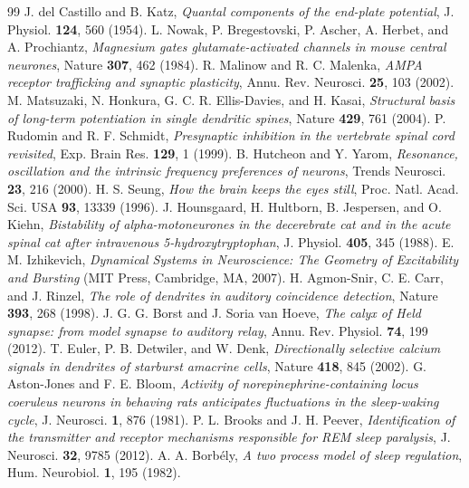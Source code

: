 \begin{thebibliography}{99}
 J. del Castillo and B. Katz, \emph{Quantal components of the end-plate potential}, J. Physiol. \textbf{124}, 560 (1954).
 L. Nowak, P. Bregestovski, P. Ascher, A. Herbet, and A. Prochiantz, \emph{Magnesium gates glutamate-activated channels in mouse central neurones}, Nature \textbf{307}, 462 (1984).
 R. Malinow and R. C. Malenka, \emph{AMPA receptor trafficking and synaptic plasticity}, Annu. Rev. Neurosci. \textbf{25}, 103 (2002).
 M. Matsuzaki, N. Honkura, G. C. R. Ellis-Davies, and H. Kasai, \emph{Structural basis of long-term potentiation in single dendritic spines}, Nature \textbf{429}, 761 (2004).
 P. Rudomin and R. F. Schmidt, \emph{Presynaptic inhibition in the vertebrate spinal cord revisited}, Exp. Brain Res. \textbf{129}, 1 (1999).
 B. Hutcheon and Y. Yarom, \emph{Resonance, oscillation and the intrinsic frequency preferences of neurons}, Trends Neurosci. \textbf{23}, 216 (2000).
 H. S. Seung, \emph{How the brain keeps the eyes still}, Proc. Natl. Acad. Sci. USA \textbf{93}, 13339 (1996).
 J. Hounsgaard, H. Hultborn, B. Jespersen, and O. Kiehn, \emph{Bistability of alpha-motoneurones in the decerebrate cat and in the acute spinal cat after intravenous 5-hydroxytryptophan}, J. Physiol. \textbf{405}, 345 (1988).
 E. M. Izhikevich, \emph{Dynamical Systems in Neuroscience: The Geometry of Excitability and Bursting} (MIT Press, Cambridge, MA, 2007).
 H. Agmon-Snir, C. E. Carr, and J. Rinzel, \emph{The role of dendrites in auditory coincidence detection}, Nature \textbf{393}, 268 (1998).
 J. G. G. Borst and J. Soria van Hoeve, \emph{The calyx of Held synapse: from model synapse to auditory relay}, Annu. Rev. Physiol. \textbf{74}, 199 (2012).
 T. Euler, P. B. Detwiler, and W. Denk, \emph{Directionally selective calcium signals in dendrites of starburst amacrine cells}, Nature \textbf{418}, 845 (2002).
 G. Aston-Jones and F. E. Bloom, \emph{Activity of norepinephrine-containing locus coeruleus neurons in behaving rats anticipates fluctuations in the sleep-waking cycle}, J. Neurosci. \textbf{1}, 876 (1981).
 P. L. Brooks and J. H. Peever, \emph{Identification of the transmitter and receptor mechanisms responsible for REM sleep paralysis}, J. Neurosci. \textbf{32}, 9785 (2012).
 A. A. Borb\'ely, \emph{A two process model of sleep regulation}, Hum. Neurobiol. \textbf{1}, 195 (1982).

\end{thebibliography}
